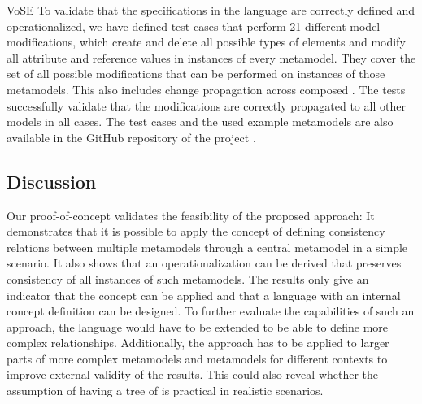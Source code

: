 \begin{copiedFrom}{VoSE}
To validate that the specifications in the \commonalities language are correctly defined and operationalized, we have
defined test cases that perform 21 different model modifications, which 
%
create and delete all possible types of elements and modify all attribute and reference values in instances of every metamodel.
They cover the set of all possible modifications that can be performed on instances of those metamodels.
This also includes change propagation across composed \commonalities.
The tests successfully validate that the modifications are correctly propagated to all other models in all cases.
The test cases and the used example metamodels are also available in the GitHub repository of the \vitruv project \cite{vitruvFrameworkGithub}. %


\subsection{Discussion}


Our proof-of-concept validates the feasibility of the proposed \commonalities approach: 
It demonstrates that it is possible to apply the concept of defining consistency relations between multiple metamodels  through a central metamodel in a simple scenario. It also shows that an operationalization can be derived that preserves consistency of all instances of such metamodels.
The results only give an indicator that the \commonalities concept can be applied and that a language with an internal concept definition can be designed.
To further evaluate the capabilities of such an approach, the language would have to be extended to be able to define more complex relationships.
Additionally, the approach has to be applied to larger parts of more complex metamodels and metamodels for different contexts to improve external validity of the results.
This could also reveal whether the assumption of having a tree of \commonalities is practical in realistic scenarios.


\end{copiedFrom}
